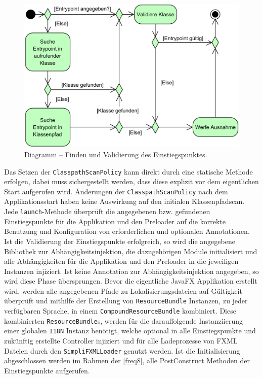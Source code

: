 \begin{figure}[H]
	\centering
	\includegraphics[width=\textwidth-2cm]{Abbildungen/Startprozess.png}
	\caption{Diagramm -- Finden und Validierung des Einstiegspunktes.}
	\label{fig:entrypoint_search}
\end{figure}
\noindent Das Setzen der \texttt{ClasspathScanPolicy} kann direkt durch eine statische Methode erfolgen, dabei muss sichergestellt werden, dass diese explizit vor dem eigentlichen Start aufgerufen wird. Änderungen der \texttt{ClasspathScanPolicy} nach dem Applikationsstart haben keine Auswirkung auf den initialen Klassenpfadscan. Jede \texttt{launch}-Methode überprüft die angegebenen bzw. gefundenen Einstiegspunkte für die Applikation und den Preloader auf die korrekte Benutzung und Konfiguration von erforderlichen und optionalen Annotationen. Ist die Validierung der Einstiegspunkte erfolgreich, so wird die angegebene Bibliothek zur Abhängigkeitsinjektion, die dazugehörigen Module initialisiert und alle Abhängigkeiten für die Applikation und den Preloader in die jeweiligen Instanzen injiziert. Ist keine Annotation zur Abhängigkeitsinjektion angegeben, so wird diese Phase übersprungen. Bevor die eigentliche JavaFX Applikation erstellt wird, werden alle angegebenen Pfade zu Lokalisierungsdateien auf Gültigkeit überprüft und mithilfe der Erstellung von \texttt{ResourceBundle} Instanzen, zu jeder verfügbaren Sprache, in einem \texttt{CompoundResourceBundle} kombiniert. Diese kombinierten \texttt{ResourceBundle}s, werden für die darauffolgende Instanziierung einer globalen \texttt{I18N} Instanz benötigt, welche optional in alle Einstiegspunkte und zukünftig erstellte Controller injiziert und für alle Ladeprozesse von FXML Dateien durch den \texttt{SimpliFXMLLoader} genutzt werden. Ist die Initialisierung abgeschlossen werden im Rahmen der \autoref{freq8}, alle PostConstruct Methoden der Einstiegspunkte aufgerufen.
